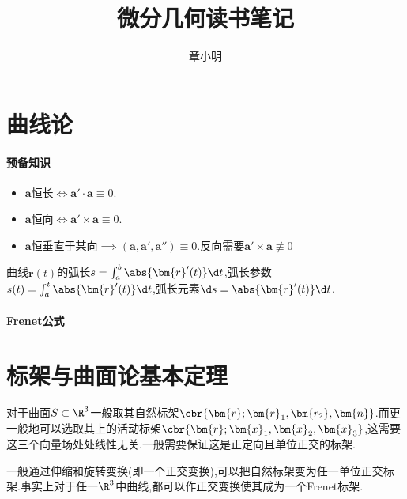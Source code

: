 \documentclass{article}
\title{微分几何读书笔记}
\author{章小明}
\begin{document}
\maketitle
\tableofcontents

\section{曲线论}
\paragraph{预备知识}
\begin{itemize}
    \item $\bm{a}$恒长$\iff \bm{a}'\cdot \bm{a}\equiv 0$.
    \item $\bm{a}$恒向$\iff \bm{a}'\times \bm{a}\equiv 0$.
    \item $\bm{a}$恒垂直于某向$\implies (\bm{a},\bm{a}',\bm{a}'')\equiv 0$.反向需要$\bm{a}'\times \bm{a}\not\equiv 0$
\end{itemize}
曲线$\bm{r}(t)$的弧长$s=\int_{a}^{b}\abs{\bm{r}'(t)}\d t$,弧长参数$s(t)=\int_a^t\abs{\bm{r}'(t)}\d t$,弧长元素$\d s=\abs{\bm{r}'(t)}\d t$.

\paragraph{Frenet公式}

\section{标架与曲面论基本定理}
对于曲面$S\subset \R^3$一般取其自然标架$\cbr{\bm{r};\bm{r}_1,\bm{r_2},\bm{n}}$.而更一般地可以选取其上的活动标架$\cbr{\bm{r};\bm{x}_1,\bm{x}_2,\bm{x}_3}$,这需要这三个向量场处处线性无关.一般需要保证这是正定向且单位正交的标架.

一般通过伸缩和旋转变换(即一个正交变换),可以把自然标架变为任一单位正交标架.事实上对于任一$\R^3$中曲线,都可以作正交变换使其成为一个Frenet标架.
\end{document}
